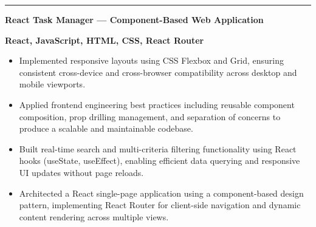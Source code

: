 \documentclass[11pt, a4paper]{article}
\begin{document}
\vspace{8pt}
\noindent%
{\color{DKGreen}\rule{4pt}{14pt}}\hspace{6pt}%
\textcolor{DarkTxt}{\textbf{\large React Task Manager — Component-Based Web Application}}\par
\vspace{1pt}
\noindent\hspace{10pt}\textcolor{DKGreen}{\textbf{\small React, JavaScript, HTML, CSS, React Router}}
\vspace{2pt}
\begin{itemize}
  \item \textcolor{MidTxt}{Implemented responsive layouts using CSS Flexbox and Grid, ensuring consistent cross-device and cross-browser compatibility across desktop and mobile viewports.}
  \item \textcolor{MidTxt}{Applied frontend engineering best practices including reusable component composition, prop drilling management, and separation of concerns to produce a scalable and maintainable codebase.}
  \item \textcolor{MidTxt}{Built real-time search and multi-criteria filtering functionality using React hooks (useState, useEffect), enabling efficient data querying and responsive UI updates without page reloads.}
  \item \textcolor{MidTxt}{Architected a React single-page application using a component-based design pattern, implementing React Router for client-side navigation and dynamic content rendering across multiple views.}
\end{itemize}
\vspace{2pt}
\end{document}
